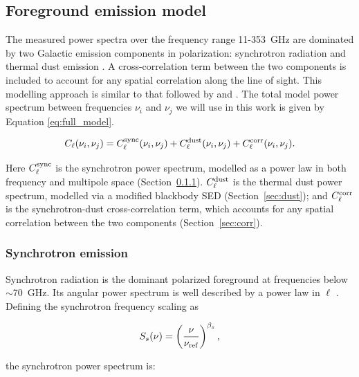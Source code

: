 \subsection{Foreground emission model}
\label{sec:foreground_model}

The measured power spectra over the frequency range 11-353~GHz are dominated by two Galactic emission components in polarization: synchrotron radiation and thermal dust emission \citep{Planck_2015X}. A cross-correlation term between the two components is included to account for any spatial correlation along the line of sight. This modelling approach is similar to that followed by \citet{Choi_2015} and \citet{Hensley_2022}. The total model power spectrum between frequencies $\nu_i$ and $\nu_j$ we will use in this work is given by Equation \ref{eq:full_model}. 

\begin{equation}
    \label{eq:full_model}
    C_\ell(\nu_i, \nu_j) = C_\ell^{\rm sync}(\nu_i, \nu_j) + C_\ell^{\rm dust}(\nu_i, \nu_j) + C_\ell^{\rm corr}(\nu_i, \nu_j).
\end{equation}

Here $C_\ell^{\rm sync}$ is the synchrotron power spectrum, modelled as a power law in both frequency and multipole space (Section~\ref{sec:synchrotron}). $C_\ell^{\rm dust}$ is the thermal dust power spectrum, modelled via a modified blackbody SED (Section~\ref{sec:dust}); and $C_\ell^{\rm corr}$ is the synchrotron-dust cross-correlation term, which accounts for any spatial correlation between the two components (Section~\ref{sec:corr}).

\subsubsection{Synchrotron emission}
\label{sec:synchrotron}

Synchrotron radiation is the dominant polarized foreground at frequencies below $\sim$70~GHz. Its angular power spectrum is well described by a power law in $\ell$ \citep{Choi_2015, Martire_2022}. Defining the synchrotron frequency scaling as

\begin{equation}
    S_s(\nu) = \left(\frac{\nu}{\nu_{\rm ref}}\right)^{\beta_s},
\end{equation}

\noindent the synchrotron power spectrum is:

